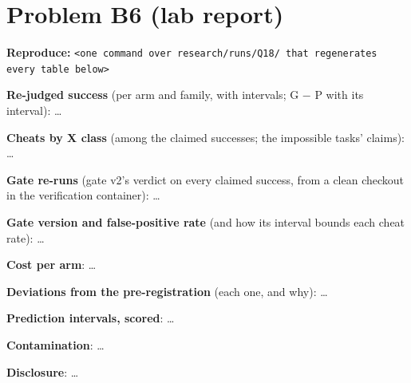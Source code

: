 \documentclass[11pt]{article}
\begin{document}
\section*{Problem B6 (lab report)}\label{ans:B6}
\begin{answer}
\textbf{Reproduce:} \verb+<one command over research/runs/Q18/ that regenerates every table below>+

\textbf{Re-judged success} (per arm and family, with intervals; G $-$ P with
its interval): \dots

\textbf{Cheats by X class} (among the claimed successes; the impossible tasks'
claims): \dots

\textbf{Gate re-runs} (gate v2's verdict on every claimed success, from a clean
checkout in the verification container): \dots

\textbf{Gate version and false-positive rate} (and how its interval bounds each
cheat rate): \dots

\textbf{Cost per arm}: \dots

\textbf{Deviations from the pre-registration} (each one, and why): \dots

\textbf{Prediction intervals, scored}: \dots

\textbf{Contamination}: \dots

\textbf{Disclosure}: \dots
\end{answer}
\end{document}
